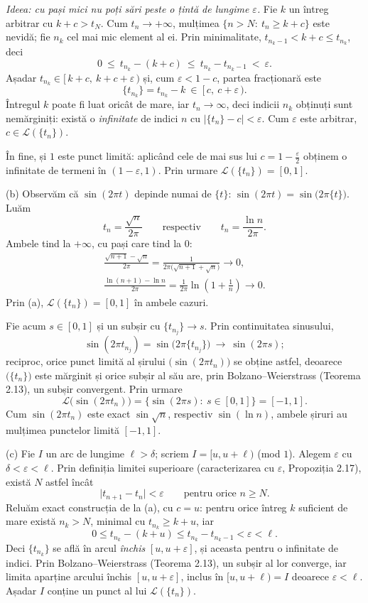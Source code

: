 \emph{Ideea: cu pași mici nu poți sări peste o țintă de lungime $\varepsilon$.} Fie $k$ un întreg arbitrar cu $k+c>t_{N}$. Cum $t_n\to+\infty$, mulțimea $\{n>N:\ t_n\ge k+c\}$ este nevidă; fie $n_k$ cel mai mic element al ei. Prin minimalitate, $t_{n_k-1}<k+c\le t_{n_k}$, deci
\[ 0\ \le\ t_{n_k}-(k+c)\ \le\ t_{n_k}-t_{n_k-1}\ <\ \varepsilon . \]
Așadar $t_{n_k}\in[\,k+c,\ k+c+\varepsilon\,)$ și, cum $\varepsilon<1-c$, partea fracționară este
\[ \{t_{n_k}\}=t_{n_k}-k\ \in\ [\,c,\ c+\varepsilon\,) . \]
Întregul $k$ poate fi luat oricât de mare, iar $t_n\to\infty$, deci indicii $n_k$ obținuți sunt nemărginiți: există o \emph{infinitate} de indici $n$ cu $|\{t_n\}-c|<\varepsilon$. Cum $\varepsilon$ este arbitrar, $c\in\mathcal{L}(\{t_n\})$.

În fine, și $1$ este punct limită: aplicând cele de mai sus lui $c=1-\frac\varepsilon2$ obținem o infinitate de termeni în $(1-\varepsilon,1)$. Prin urmare $\mathcal{L}(\{t_n\})=[0,1]$.

(b) Observăm că $\sin(2\pi t)$ depinde numai de $\{t\}$: $\sin(2\pi t)=\sin\bigl(2\pi\{t\}\bigr)$. Luăm
\[ t_n=\frac{\sqrt n}{2\pi}\qquad\text{respectiv}\qquad t_n=\frac{\ln n}{2\pi} . \]
Ambele tind la $+\infty$, cu pași care tind la $0$:
\[ \begin{gathered} \frac{\sqrt{n+1}-\sqrt n}{2\pi}=\frac{1}{2\pi\bigl(\sqrt{n+1}+\sqrt n\bigr)}\to0,\\ \frac{\ln(n+1)-\ln n}{2\pi}=\frac{1}{2\pi}\ln\!\left(1+\frac1n\right)\to0 . \end{gathered} \]
Prin (a), $\mathcal{L}(\{t_n\})=[0,1]$ în ambele cazuri.

Fie acum $s\in[0,1]$ și un subșir cu $\{t_{n_j}\}\to s$. Prin continuitatea sinusului,
\[ \sin(2\pi t_{n_j})=\sin\bigl(2\pi\{t_{n_j}\}\bigr)\ \longrightarrow\ \sin(2\pi s) ; \]
reciproc, orice punct limită al șirului $\bigl(\sin(2\pi t_n)\bigr)$ se obține astfel, deoarece $\bigl(\{t_n\}\bigr)$ este mărginit și orice subșir al său are, prin Bolzano--Weierstrass (Teorema 2.13), un subșir convergent. Prin urmare
\[ \mathcal{L}\bigl(\sin(2\pi t_n)\bigr)=\bigl\{\sin(2\pi s):\ s\in[0,1]\bigr\}=[-1,1] . \]
Cum $\sin(2\pi t_n)$ este exact $\sin\sqrt n$, respectiv $\sin(\ln n)$, ambele șiruri au mulțimea punctelor limită $[-1,1]$.

(c) Fie $I$ un arc de lungime $\ell>\delta$; scriem $I=[u,u+\ell)$ (mod $1$). Alegem $\varepsilon$ cu $\delta<\varepsilon<\ell$. Prin definiția limitei superioare (caracterizarea cu $\varepsilon$, Propoziția 2.17), există $N$ astfel încât
\[ \bigl|t_{n+1}-t_n\bigr|<\varepsilon\qquad\text{pentru orice }n\ge N . \]
Reluăm exact construcția de la (a), cu $c=u$: pentru orice întreg $k$ suficient de mare există $n_k>N$, minimal cu $t_{n_k}\ge k+u$, iar
\[ 0\le t_{n_k}-(k+u)\le t_{n_k}-t_{n_k-1}<\varepsilon<\ell . \]
Deci $\{t_{n_k}\}$ se află în arcul \emph{închis} $[u,u+\varepsilon]$, și aceasta pentru o infinitate de indici. Prin Bolzano--Weierstrass (Teorema 2.13), un subșir al lor converge, iar limita aparține arcului închis $[u,u+\varepsilon]$, inclus în $[u,u+\ell)=I$ deoarece $\varepsilon<\ell$. Așadar $I$ conține un punct al lui $\mathcal{L}(\{t_n\})$.

